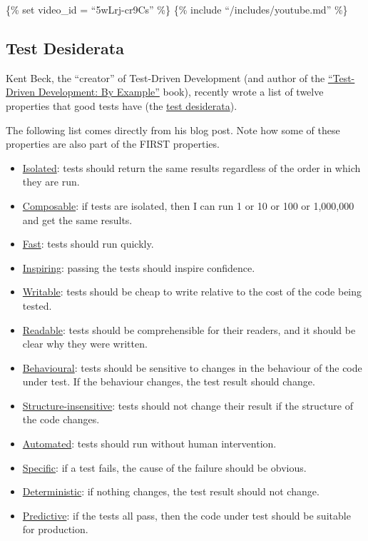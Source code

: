 \{\% set video\_id = ``5wLrj-cr9Cs'' \%\} \{\% include
``/includes/youtube.md'' \%\}

\hypertarget{test-desiderata}{%
\subsection{Test Desiderata}\label{test-desiderata}}

Kent Beck, the ``creator'' of Test-Driven Development (and author of the
\href{https://www.amazon.com/Test-Driven-Development-Kent-Beck/dp/0321146530}{``Test-Driven
Development: By Example''} book), recently wrote a list of twelve
properties that good tests have (the
\href{https://medium.com/@kentbeck_7670/test-desiderata-94150638a4b3}{test
desiderata}).

The following list comes directly from his blog post. Note how some of
these properties are also part of the FIRST properties.

\begin{itemize}
\tightlist
\item
  \href{https://www.youtube.com/watch?v=HApI2cspQus}{Isolated}: tests
  should return the same results regardless of the order in which they
  are run.
\item
  \href{https://www.youtube.com/watch?v=Wf3WXYaMt8E}{Composable}: if
  tests are isolated, then I can run 1 or 10 or 100 or 1,000,000 and get
  the same results.
\item
  \href{https://www.youtube.com/watch?v=L0dZ7MmW6xc}{Fast}: tests should
  run quickly.
\item
  \href{https://www.youtube.com/watch?v=2Q1O8XBVbZQ}{Inspiring}: passing
  the tests should inspire confidence.
\item
  \href{https://www.youtube.com/watch?v=CAttTEUE9HM}{Writable}: tests
  should be cheap to write relative to the cost of the code being
  tested.
\item
  \href{https://www.youtube.com/watch?v=bDaFPACTjj8}{Readable}: tests
  should be comprehensible for their readers, and it should be clear why
  they were written.
\item
  \href{https://www.youtube.com/watch?v=5LOdKDqdWYU}{Behavioural}: tests
  should be sensitive to changes in the behaviour of the code under
  test. If the behaviour changes, the test result should change.
\item
  \href{https://www.youtube.com/watch?v=bvRRbWbQwDU}{Structure-insensitive}:
  tests should not change their result if the structure of the code
  changes.
\item
  \href{https://www.youtube.com/watch?v=YQlmP08dj6g}{Automated}: tests
  should run without human intervention.
\item
  \href{https://www.youtube.com/watch?v=8lTfrCtPPNE}{Specific}: if a
  test fails, the cause of the failure should be obvious.
\item
  \href{https://www.youtube.com/watch?v=PwWyp-wpFiw}{Deterministic}: if
  nothing changes, the test result should not change.
\item
  \href{https://www.youtube.com/watch?v=7o5qxxx7SmI}{Predictive}: if the
  tests all pass, then the code under test should be suitable for
  production.
\end{itemize}


